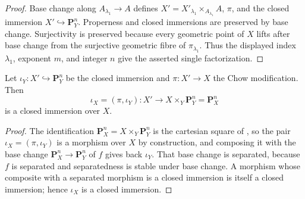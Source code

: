 \begin{proof}
Base change along $A_{\lambda_1}\to A$ defines
$X'=X'_{\lambda_1}\times_{A_{\lambda_1}}A$, $\pi$, and the closed immersion
$X'\hookrightarrow\mathbf P^n_Y$.  Properness and closed immersions are
preserved by base change.  Surjectivity is preserved because every geometric
point of $X$ lifts after base change from the surjective geometric fibre of
$\pi_{\lambda_1}$.  Thus the displayed index $\lambda_1$, exponent $m$, and
integer $n$ give the asserted single factorization.
\end{proof}

\begin{lemma}
\label{lemma:weil-pbc-chow-embedding-over-x}
\leanok

Let $\iota_Y:X'\hookrightarrow\mathbf P^n_Y$ be the closed immersion and
$\pi:X'\to X$ the Chow modification.  Then
\[
 \iota_X=(\pi,\iota_Y):X'\longrightarrow
 X\times_Y\mathbf P^n_Y=\mathbf P^n_X
\]
is a closed immersion over $X$.
\end{lemma}
\begin{proof}
\leanok

The identification $\mathbf P^n_X=X\times_Y\mathbf P^n_Y$ is the cartesian square of
, so the pair
$\iota_X=(\pi,\iota_Y)$ is a morphism over $X$ by construction, and
composing it with the base change $\mathbf P^n_X\to\mathbf P^n_Y$ of $f$ gives back
$\iota_Y$.  That base change is separated, because $f$ is separated and separatedness is
stable under base change.  A morphism whose composite with a separated morphism is a closed
immersion is itself a closed immersion; hence $\iota_X$ is a closed immersion.
\end{proof}

